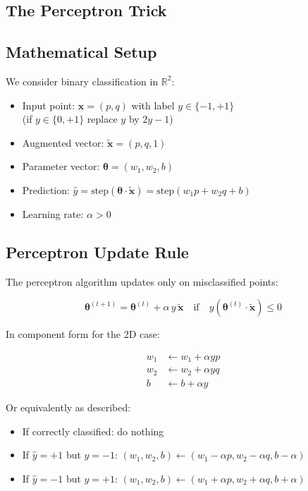 \begin{notechapter}
\chapter{The Perceptron Trick}\label{ch:perceptron-trick}

\section{Mathematical Setup}

We consider binary classification in $\mathbb{R}^2$:

\begin{itemize}
    \item Input point: $\mathbf{x} = (p, q)$ with label $y \in \{-1, +1\}$ \\
    (if $y \in \{0, +1\}$ replace $y$ by $2y-1$)
    \item Augmented vector: $\tilde{\mathbf{x}} = (p, q, 1)$
    \item Parameter vector: $\boldsymbol{\theta} = (w_1, w_2, b)$
    \item Prediction: $\hat{y} = \text{step}
    (\boldsymbol{\theta} \cdot \tilde{\mathbf{x}}) = \text{step}(w_1 p + w_2 q + b)$
    \item Learning rate: $\alpha > 0$
\end{itemize}

\section{Perceptron Update Rule}

The perceptron algorithm updates only on misclassified points:

\[
\boldsymbol{\theta}^{(t+1)} = \boldsymbol{\theta}^{(t)} + \alpha \, y \, \tilde{\mathbf{x}} \quad \text{if} \quad y(\boldsymbol{\theta}^{(t)} \cdot \tilde{\mathbf{x}}) \leq 0
\]

In component form for the 2D case:

\begin{align*}
w_1 &\leftarrow w_1 + \alpha y p \\
w_2 &\leftarrow w_2 + \alpha y q \\
b &\leftarrow b + \alpha y
\end{align*}

Or equivalently as described:

\begin{itemize}
    \item If correctly classified: do nothing
    \item If $\hat{y}=+1$ but $y=-1$: $(w_1, w_2, b) \leftarrow (w_1 - \alpha p, w_2 - \alpha q, b - \alpha)$
    \item If $\hat{y}=-1$ but $y=+1$: $(w_1, w_2, b) \leftarrow (w_1 + \alpha p, w_2 + \alpha q, b + \alpha)$
\end{itemize}


\end{notechapter}
